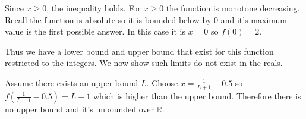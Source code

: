 \documentclass{article}
\begin{document}
Since $x \geq 0$, the inequality holds. For $x \geq 0$ the function is monotone
decreasing. Recall the function is absolute so it is bounded below by 0 and
it's maximum value is the first possible answer. In this case it is $x=0$
so $f(0) = 2$. 

Thus we have a lower bound and upper bound that exist for this function
restricted to the integers. We now show such limits do not exist in the reals.

Assume there exists an upper bound $L$. Choose $x = \frac{1}{L + 1} - 0.5$ so
$f\left(\frac{1}{L+1} - 0.5\right) = L+1$ which is higher
than the upper bound.
Therefore there is no upper bound and it's unbounded over $\mathbb{R}$.
\end{document}
